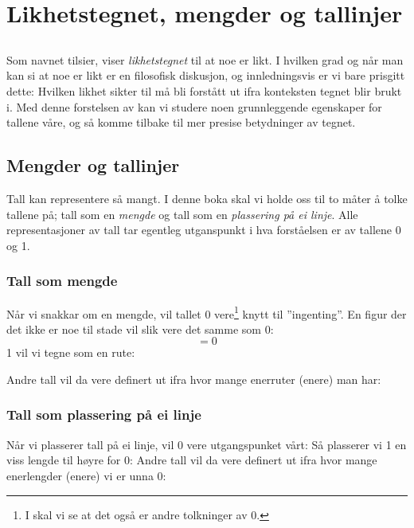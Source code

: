 



\newpage
\section{Likhetstegnet, mengder og tallinjer}
\subsection*{\likteikn}
Som navnet tilsier, viser \textit{likhetstegnet}  \sym{$ = $} til at noe er likt. I hvilken grad og når man kan si at noe er likt er en filosofisk diskusjon, og innledningsvis er vi bare prisgitt dette: Hvilken likhet \sym{$=$} sikter til må bli forstått ut ifra konteksten tegnet blir brukt i. Med denne forstelsen av \sym{$ = $} kan vi studere noen grunnleggende egenskaper for tallene våre, og så komme tilbake til mer presise betydninger av tegnet. \regv
{}
\subsection*{Mengder og tallinjer}
Tall kan representere så mangt. I denne boka skal vi holde oss til to måter å tolke tallene på; tall som en \textsl{mengde} og tall som en \textsl{plassering på ei linje}. Alle representasjoner av tall tar egentleg utganspunkt i hva forståelsen er av tallene 0 og 1.

\subsubsection*{Tall som mengde}
	Når vi snakkar om en mengde, vil tallet 0 vere\footnote{I  skal vi se at det også er andre tolkninger av 0.} knytt til ''ingenting''. En figur der det ikke er noe til stade vil slik vere det samme som 0:
	\[ =0 \]
	1 vil vi tegne som en rute:

Andre tall vil da vere definert ut ifra hvor mange enerruter (enere) man har:
\newpage	
\subsubsection*{Tall som plassering på ei linje}
	Når vi plasserer tall på ei linje, vil 0 vere utgangspunket vårt:
	Så plasserer vi 1 en viss lengde til høyre for 0:
	Andre tall vil da vere definert ut ifra hvor mange enerlengder (enere) vi er unna 0:
